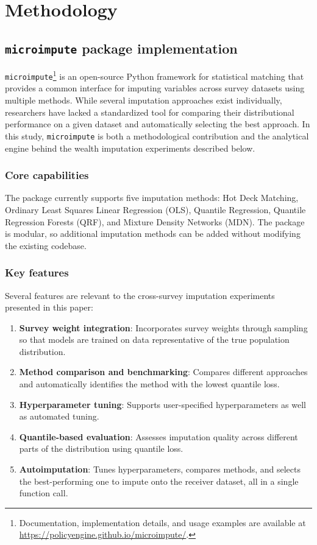 \section{Methodology}\label{sec:methodology}

\subsection{\texttt{microimpute} package implementation}

\texttt{microimpute}\footnote{Documentation, implementation details, and usage examples are available at \url{https://policyengine.github.io/microimpute/}.} is an open-source Python framework for statistical matching that provides a common interface for imputing variables across survey datasets using multiple methods. While several imputation approaches exist individually, researchers have lacked a standardized tool for comparing their distributional performance on a given dataset and automatically selecting the best approach. In this study, \texttt{microimpute} is both a methodological contribution and the analytical engine behind the wealth imputation experiments described below.

\subsubsection{Core capabilities}

The package currently supports five imputation methods: Hot Deck Matching, Ordinary Least Squares Linear Regression (OLS), Quantile Regression, Quantile Regression Forests (QRF), and Mixture Density Networks (MDN). The package is modular, so additional imputation methods can be added without modifying the existing codebase.

\subsubsection{Key features}

Several features are relevant to the cross-survey imputation experiments presented in this paper:

\begin{enumerate}
    \item \textbf{Survey weight integration}: Incorporates survey weights through sampling so that models are trained on data representative of the true population distribution.
    \item \textbf{Method comparison and benchmarking}: Compares different approaches and automatically identifies the method with the lowest quantile loss.
    \item \textbf{Hyperparameter tuning}: Supports user-specified hyperparameters as well as automated tuning.
    \item \textbf{Quantile-based evaluation}: Assesses imputation quality across different parts of the distribution using quantile loss.
    \item \textbf{Autoimputation}: Tunes hyperparameters, compares methods, and selects the best-performing one to impute onto the receiver dataset, all in a single function call.
\end{enumerate}

